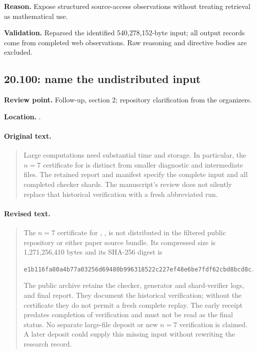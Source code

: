 \noindent\textbf{Reason.} Expose structured source-access observations without treating retrieval as mathematical use.

\noindent\textbf{Validation.} Reparsed the identified 540,278,152-byte input; all output records come from completed web observations. Raw reasoning and directive bodies are excluded.

\subsection{20.100: name the undistributed input}
\noindent\textbf{Review point.} Follow-up, section 2; repository clarification from the organizers.\par
\noindent\textbf{Location.} .

\paragraph{Original text.}
\begin{quote}\small
Large computations need substantial time and storage.
In particular, the \(n=7\) certificate for 
is distinct from smaller diagnostic and intermediate
files. The retained report and manifest specify the
complete input and all completed checker shards.
The manuscript's review does not silently replace that
historical verification with a fresh abbreviated run.
\end{quote}

\paragraph{Revised text.}
\begin{quote}\small
The \(n=7\) certificate for ,
, is not distributed in the
filtered public repository or either paper source bundle. Its compressed
size is 1,271,256,410 bytes and its SHA-256 digest is
\begin{center}\small
\nolinkurl{e1b116fa80a4b77a03256d69480b996318522c227ef48e6be7fdf62cbd8bcd8c}.
\end{center}
The public archive retains the checker, generator and shard-verifier
logs, and final report. They document the historical verification;
without the certificate they do not permit a fresh complete replay.
The early  receipt predates completion
of verification and must not be read as the final status.
No separate large-file deposit or new \(n=7\) verification is claimed.
A later deposit could supply this missing input without rewriting the
research record.
\end{quote}

